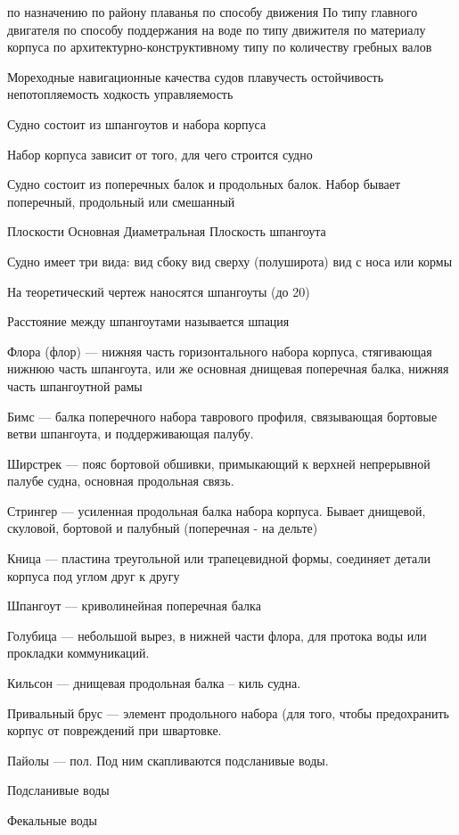 \documentclass{article}        %
\begin{document}
по назначению
по району плаванья
по способу движения
По типу главного двигателя
по способу поддержания на воде
по типу движителя
по материалу корпуса
по архитектурно-конструктивному типу
по количеству гребных валов

Мореходные навигационные качества судов
плавучесть
остойчивость
непотопляемость
ходкость
управляемость


Судно состоит из шпангоутов и набора корпуса

Набор корпуса зависит от того, для чего строится судно

Судно состоит из поперечных балок и продольных балок. Набор бывает поперечный, продольный или смешанный

Плоскости
Основная
Диаметральная
Плоскость шпангоута

Судно имеет три вида:
вид сбоку
вид сверху (полуширота)
вид с носа или кормы

На теоретический чертеж наносятся шпангоуты
(до 20)

Расстояние между шпангоутами называется шпация


Флора (флор) --- нижняя часть горизонтального набора корпуса, 
	стягивающая нижнюю часть шпангоута, или же основная
	днищевая поперечная балка, нижняя часть шпангоутной рамы

Бимс --- балка поперечного набора таврового профиля, связывающая 
	бортовые ветви шпангоута, и поддерживающая палубу.


Ширстрек --- пояс бортовой обшивки, примыкающий к верхней непрерывной 
	палубе судна, основная продольная связь.

Стрингер --- усиленная продольная балка набора корпуса. Бывает
	днищевой, скуловой, бортовой и палубный (поперечная - на дельте)

Кница --- пластина треугольной или трапецевидной формы, соединяет детали корпуса под углом друг к другу

Шпангоут --- криволинейная поперечная балка

Голубица --- небольшой вырез, в нижней части флора, для протока воды или прокладки коммуникаций.

Кильсон --- днищевая продольная балка -- киль судна.

Привальный брус --- элемент продольного набора (для того, чтобы предохранить корпус от повреждений
	при швартовке. 

Пайолы --- пол. Под ним скапливаются подсланивые воды.

Подсланивые воды

Фекальные воды
\end{document}
